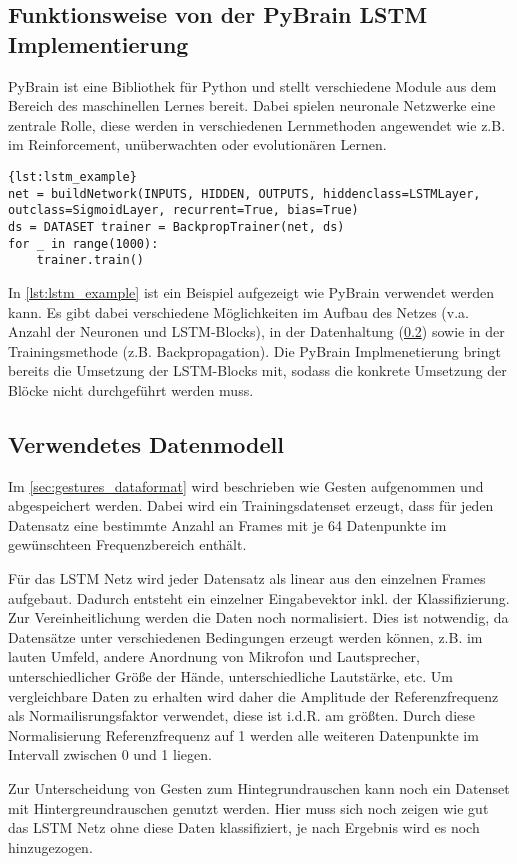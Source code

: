 \subsection{Funktionsweise von der \acs{PyBrain} \acs{LSTM} Implementierung}
\ac{PyBrain}\cite{schaul2010} ist eine Bibliothek für Python und stellt
verschiedene Module aus dem Bereich des maschinellen Lernes bereit. Dabei
spielen neuronale Netzwerke eine zentrale Rolle, diese werden in verschiedenen
Lernmethoden angewendet wie z.B. im Reinforcement, unüberwachten oder
evolutionären Lernen.

\begin{lstlisting}[caption={Aufbau eines LSTM Netzes},label={lst:lstm_example}]{lst:lstm_example} 
net = buildNetwork(INPUTS, HIDDEN, OUTPUTS, hiddenclass=LSTMLayer,
outclass=SigmoidLayer, recurrent=True, bias=True) 
ds = DATASET trainer = BackpropTrainer(net, ds)
for _ in range(1000):
    trainer.train()
\end{lstlisting}
 
In \autoref{lst:lstm_example} ist ein Beispiel aufgezeigt wie
\ac{PyBrain} verwendet werden kann. Es gibt dabei verschiedene Möglichkeiten im Aufbau des Netzes
(v.a. Anzahl der Neuronen und \ac{LSTM}-Blocks), in der Datenhaltung
(\ref{sec:lstm_data}) sowie in der Trainingsmethode (z.B. Backpropagation). 
Die \ac{PyBrain} Implmenetierung bringt bereits die Umsetzung der
\ac{LSTM}-Blocks mit, sodass die konkrete Umsetzung der Blöcke nicht
durchgeführt werden muss. 

\subsection{Verwendetes Datenmodell}
\label{sec:lstm_data}

Im \autoref{sec:gestures_dataformat} wird beschrieben wie Gesten aufgenommen und
abgespeichert werden. Dabei wird ein Trainingsdatenset erzeugt, dass für
jeden Datensatz eine bestimmte Anzahl an Frames mit je 64 Datenpunkte im
gewünschteen Frequenzbereich enthält. 

Für das \ac{LSTM} Netz wird jeder Datensatz als linear aus den einzelnen Frames
aufgebaut. Dadurch entsteht ein einzelner Eingabevektor inkl. der
Klassifizierung. Zur Vereinheitlichung werden die Daten noch normalisiert. Dies
ist notwendig, da Datensätze unter verschiedenen Bedingungen erzeugt werden
können, z.B. im lauten Umfeld, andere Anordnung von Mikrofon und Lautsprecher,
unterschiedlicher Größe der Hände, unterschiedliche Lautstärke, etc. Um
vergleichbare Daten zu erhalten wird daher die Amplitude der Referenzfrequenz
als Normailisrungsfaktor verwendet, diese ist i.d.R. am größten. Durch diese
Normalisierung Referenzfrequenz auf 1 werden alle weiteren Datenpunkte im
Intervall zwischen 0 und 1 liegen. 

Zur Unterscheidung von Gesten zum Hintegrundrauschen kann noch ein Datenset mit
Hintergreundrauschen genutzt werden. Hier muss sich noch zeigen wie gut das
\ac{LSTM} Netz ohne diese Daten klassifiziert, je nach Ergebnis wird es noch
hinzugezogen. 





\nocite{GERS2001,WIKI2013,Schmidhuber2013,LSTM1,Nerbonne1}
